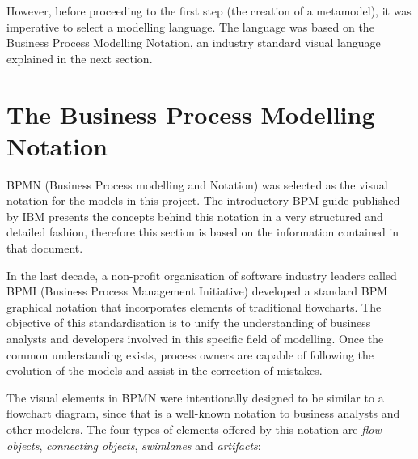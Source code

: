 \documentclass[11pt, a4paper, oneside, openright]{article}
\begin{document}
However, before proceeding to the first step (the creation of a metamodel), it
was imperative to select a modelling language. The language was based on the
Business Process Modelling Notation, an industry standard visual language
explained in the next section.

\section{The Business Process Modelling Notation}

BPMN (Business Process modelling and Notation) was selected as the visual
notation for the models in this project. The introductory BPM guide published by
IBM \cite{bpmnIntro} presents the concepts behind this notation in a very structured and
detailed fashion, therefore this section is based on the information
contained in that document.

In the last decade, a non-profit organisation of software industry leaders
called BPMI (Business Process Management Initiative) developed a standard BPM
graphical notation that incorporates elements of traditional flowcharts. The
objective of this standardisation is to unify the understanding of business
analysts and developers involved in this specific field of modelling. Once the
common understanding exists, process owners are capable of following the
evolution of the models and assist in the correction of mistakes.

The visual elements in BPMN were intentionally designed to be similar to a
flowchart diagram, since that is a well-known notation to business analysts and
other modelers. The four types of elements offered by this notation are \textit{flow
objects}, \textit{connecting objects}, \textit{swimlanes} and \textit{artifacts}:
\end{document}
